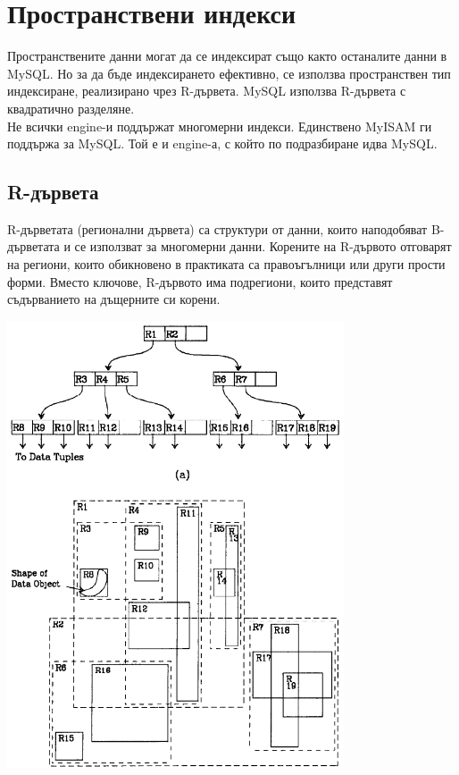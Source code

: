 \documentclass[a4paper,10pt]{article}
\begin{document}
\section{Пространствени индекси}
Пространствените данни могат да се индексират също както останалите данни в MySQL. Но за да бъде 
индексирането ефективно, се използва пространствен тип индексиране, реализирано чрез R-дървета. 
MySQL използва R-дървета с квадратично разделяне. \\
Не всички engine-и поддържат многомерни индекси. Единствено MyISAM ги поддържа за MySQL. Той е и engine-а, с който 
по подразбиране идва MySQL.

\subsection{R-дървета}
R-дърветата (регионални дървета) са структури от данни, които наподобяват B-дърветата и се използват за многомерни данни.
Корените на R-дървото отговарят на региони, които обикновено в практиката са правоъгълници или други прости форми. 
Вместо ключове, R-дървото има подрегиони, които представят съдърванието на дъщерните си корени.
\begin{center}
\includegraphics[width=100mm]{rtree.png}\end{center}
\end{document}
